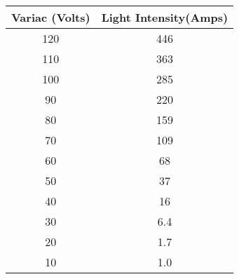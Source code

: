 \begin{tabular}{@{}cc@{}}
\toprule
\textbf{Variac (Volts)} & \textbf{Light Intensity(Amps)}  \\ \midrule
        120             &         446                       \\        
        110             &        363                        \\         
        100             &       285                         \\    
        90              &        220                        \\     
        80              &       159                         \\  
        70              &        109                        \\ 
        60              &        68                       \\
        50              &        37                        \\
        40              &       16                          \\
        30              &        6.4                         \\
        20              &       1.7                         \\
        10              &         1.0                      \\ \bottomrule
\end{tabular}